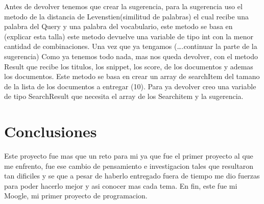 \documentclass[12pt,a4paper]{article}
\begin{document}
\newline
\hspace{1cm}
Antes de devolver tenemos que crear la sugerencia, para la sugerencia uso el metodo de la distancia de Levenstien(similitud de palabras) el cual recibe una palabra del Query y una palabra del vocabulario, este metodo se basa en (explicar esta talla) este metodo devuelve una variable de tipo int con la menor cantidad de combinaciones.  Una vez que ya tengamos (….continuar la parte de la sugerencia)
\newline
 Como ya tenemos todo nada, mas nos queda devolver, con el metodo Result que recibe los titulos, los snippet, los score, de los  documentos y ademas los documentos. Este metodo se basa en crear un array de searchItem del tamano de la lista de los documentos a entregar (10). 
 \newline
Para ya devolver  creo una variable de tipo SearchResult que necesita el array de  los Searchitem y la sugerencia. 
\section*{Conclusiones}
Este proyecto fue mas que un reto para mi ya que fue el primer proyecto al que me enfrento, fue ese cambio de pensamiento e investigacion tales que resultaron tan dificiles y se que a pesar de haberlo entregado fuera de tiempo me dio fuerzas para poder hacerlo mejor y asi conocer mas cada tema. En fin, este fue mi Moogle, mi primer proyecto de programacion.
 
\end{document}
